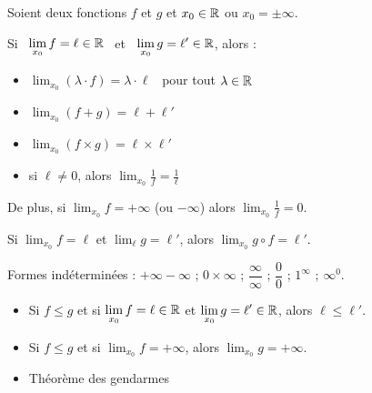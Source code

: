 \documentclass[10pt,class=article,crop=false]{standalone}
\begin{document}
\begin{multicols}{2}
\begin{definition}
\begin{itemize}
	\end{itemize}
\end{definition}




\begin{proposition}\sauteligne
\end{proposition}



Soient deux fonctions $f$ et $g$ et $x_0 \in \mathbb{R}$ ou $x_0=\pm\infty$.

\begin{proposition}
	Si \  $\displaystyle\lim_{x_0} f=\ell\in\mathbb{R}$ \  et \  $\displaystyle\lim_{x_0} g=\ell'\in\mathbb{R}$, alors :
	\begin{itemize}
		\item $\displaystyle\lim_{x_0} (\lambda\cdot f)=\lambda\cdot \ell$ \ pour tout $\lambda\in\mathbb{R}$
		\item $\displaystyle\lim_{x_0} (f+g) = \ell+\ell'$
		\item $\displaystyle\lim_{x_0} (f\times g) = \ell\times \ell'$
		\item si $\ell\neq 0$, alors $\displaystyle\lim_{x_0} \frac1f = \frac1\ell$
	\end{itemize}
	De plus, si $\displaystyle\lim_{x_0} f=+\infty$ (ou $-\infty$) alors $\displaystyle\lim_{x_0} \frac1f = 0$.
\end{proposition}



\begin{proposition}
	Si $\displaystyle\lim_{x_0} f=\ell$ et $\displaystyle\lim_\ell g=\ell'$, alors
	$\displaystyle\lim_{x_0} g\circ f=\ell'$.
\end{proposition}


Formes indéterminées : $+\infty-\infty$ ; $0\times \infty$ ;
$\dfrac\infty\infty$ ; $\dfrac00$ ; $1^\infty$ ; $\infty^0$.


\begin{proposition}
	\sauteligne
	\begin{itemize}
		\item Si $f\leq g$ et si $\displaystyle\lim_{x_0} f=\ell\in\mathbb{R}$ et $\displaystyle\lim_{x_0} g=\ell'\in\mathbb{R}$, alors $\ell\leq \ell'$.
		\item Si $f\leq g$ et si $\displaystyle\lim_{x_0} f=+\infty$, alors  $\displaystyle\lim_{x_0} g=+\infty$.
		\item Théorème des gendarmes
	\end{itemize}
\end{proposition}


\end{multicols}
\end{document}
